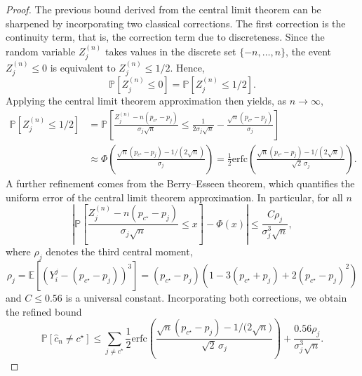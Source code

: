 \begin{proof}
The previous bound derived from the central limit theorem can be sharpened by incorporating two classical corrections.
The first correction is the continuity term, that is, the correction term due to discreteness. Since the random variable $Z_j^{(n)}$ takes values in the discrete set $\{-n, \dots, n\}$, the event $Z_j^{(n)}\leq 0$ is equivalent to $Z_j^{(n)}\leq 1/2$. Hence,
$$
\mathbb{P}\left[Z_j^{(n)}\leq 0\right] = \mathbb{P}\left[Z_j^{(n)}\le 1/2\right].
$$
Applying the central limit theorem approximation then yields, as $n\to\infty$,
\begin{align*}
\mathbb P\left[Z_j^{(n)}\le 1/2\right]
&= \mathbb P\left[\frac{Z_j^{(n)}-n(p_{c^\star}-p_j)}{\sigma_j\sqrt n}
                 \le\frac{1}{2\sigma_j\sqrt{n}} -\frac{\sqrt n(p_{c^\star}-p_j)}{\sigma_j}\right]\\
&\approx \Phi\left(\frac{\sqrt n(p_{c^\star}-p_j)-1/(2\sqrt{n})}{\sigma_j}\right) = \frac{1}{2}\text{erfc} \left(\frac{\sqrt n(p_{c^\star}-p_j)-1/(2\sqrt{n})}{\sqrt{2}\,\sigma_j}\right).
\end{align*}
A further refinement comes from the Berry–Esseen theorem, which quantifies the uniform error of the central limit theorem approximation. In particular, for all $n$
$$
\left\vert \mathbb{P}\left[\frac{Z_j^{(n)}-n(p_{c^\star}-p_j)}{\sigma_j\sqrt n}\le x\right] -\Phi(x)\right\vert \leq \frac{C \rho_j}{\sigma_j^3\sqrt{n}},
$$
where $\rho_j$ denotes the third central moment,
$$
\rho_j = \mathbb{E}\left[\left(Y_i^j-(p_{c^\star}-p_j)\right)^3\right] = (p_{c^\star} - p_{j})(1-3(p_{c^\star} + p_{j}) + 2(p_{c^\star} - p_{j})^2)
$$
and $C\le 0.56$ is a universal constant. Incorporating both corrections, we obtain the refined bound
$$
\mathbb P[\hat{c}_n\neq c^\star]\leq \sum_{j \neq c^\star}\frac{1}{2}\text{erfc}\left(\frac{{\sqrt{n}(p_{c^\star}-p_j)} - {1}/{(2\sqrt{n}})}{\sqrt{2}\,\sigma_j}\right) + \frac{0.56\rho_j}{\sigma_j^3\sqrt{n}}.
$$
\end{proof}